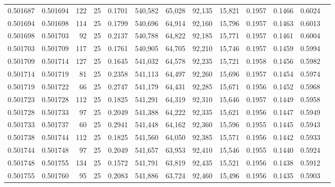 \begin{tabular}{rrrrrrrrrrrrr}
0.501687 & 0.501694 & 122 &  25 &                                     0.1701 & 540,582 &  65,028 &  92,135 &  15,821 & 0.1957 & 0.1466 & 0.6024 \\
0.501694 & 0.501698 & 114 &  25 &                                     0.1799 & 540,696 &  64,914 &  92,160 &  15,796 & 0.1957 & 0.1463 & 0.6013 \\
0.501698 & 0.501703 &  92 &  25 &                                     0.2137 & 540,788 &  64,822 &  92,185 &  15,771 & 0.1957 & 0.1461 & 0.6004 \\
0.501703 & 0.501709 & 117 &  25 &                                     0.1761 & 540,905 &  64,705 &  92,210 &  15,746 & 0.1957 & 0.1459 & 0.5994 \\
0.501709 & 0.501714 & 127 &  25 &                                     0.1645 & 541,032 &  64,578 &  92,235 &  15,721 & 0.1958 & 0.1456 & 0.5982 \\
0.501714 & 0.501719 &  81 &  25 &                                     0.2358 & 541,113 &  64,497 &  92,260 &  15,696 & 0.1957 & 0.1454 & 0.5974 \\
0.501719 & 0.501722 &  66 &  25 &                                     0.2747 & 541,179 &  64,431 &  92,285 &  15,671 & 0.1956 & 0.1452 & 0.5968 \\
0.501723 & 0.501728 & 112 &  25 &                                     0.1825 & 541,291 &  64,319 &  92,310 &  15,646 & 0.1957 & 0.1449 & 0.5958 \\
0.501728 & 0.501733 &  97 &  25 &                                     0.2049 & 541,388 &  64,222 &  92,335 &  15,621 & 0.1956 & 0.1447 & 0.5949 \\
0.501733 & 0.501737 &  60 &  25 &                                     0.2941 & 541,448 &  64,162 &  92,360 &  15,596 & 0.1955 & 0.1445 & 0.5943 \\
0.501738 & 0.501744 & 112 &  25 &                                     0.1825 & 541,560 &  64,050 &  92,385 &  15,571 & 0.1956 & 0.1442 & 0.5933 \\
0.501744 & 0.501748 &  97 &  25 &                                     0.2049 & 541,657 &  63,953 &  92,410 &  15,546 & 0.1955 & 0.1440 & 0.5924 \\
0.501748 & 0.501755 & 134 &  25 &                                     0.1572 & 541,791 &  63,819 &  92,435 &  15,521 & 0.1956 & 0.1438 & 0.5912 \\
0.501755 & 0.501760 &  95 &  25 &                                     0.2083 & 541,886 &  63,724 &  92,460 &  15,496 & 0.1956 & 0.1435 & 0.5903 \\

\end{tabular}
